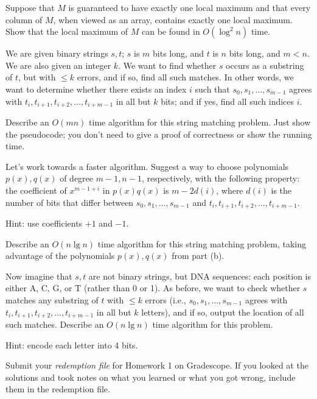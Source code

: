 \begin{qunlist}
Suppose that $M$ is guaranteed to have exactly one local maximum and that every column of $M$, when viewed as an array, contains exactly one local maximum. Show that the local maximum of $M$ can be found in $O(\log^2 n)$ time. 




\pagebreak
{}

We are given binary strings $s,t$; $s$ is $m$ bits long, and $t$ is $n$ bits long,
and $m<n$.
We are also given an integer $k$.
We want to find whether $s$ occurs as a substring of $t$,
but with $\le k$ errors, and if so, find all such matches.
In other words, we want to determine whether there exists an index $i$
such that $s_0,s_1,\dots,s_{m-1}$ agrees with
$t_i,t_{i+1},t_{i+2},\dots,t_{i+m-1}$ in all but $k$ bits; and if yes,
find all such indices $i$.
\begin{qparts}
\item Describe an $O(mn)$ time algorithm for this string matching problem.
Just show the pseudocode; you don't need to give a proof of correctness
or show the running time.

\item Let's work towards a faster algorithm.
Suggest a way to choose polynomials $p(x),q(x)$ of degree $m-1,n-1$,
respectively, with the following property:
the coefficient of $x^{m-1+i}$ in $p(x)q(x)$ is $m-2d(i)$,
where $d(i)$ is the number of bits that differ between
$s_0,s_1,\dots,s_{m-1}$ and $t_i,t_{i+1},t_{i+2},\dots,t_{i+m-1}$.

Hint: use coefficients $+1$ and $-1$.

\item Describe an $O(n \lg n)$ time algorithm for this string matching problem,
taking advantage of the polynomials $p(x),q(x)$ from part (b).

\item Now imagine that $s,t$ are not binary strings, but DNA sequences:
each position is either A, C, G, or T (rather than 0 or 1).
As before, we want to check whether $s$ matches any substring of $t$
with $\le k$ errors
(i.e., $s_0,s_1,\dots,s_{m-1}$ agrees with
$t_i,t_{i+1},t_{i+2},\dots,t_{i+m-1}$ in all but $k$ letters),
and if so, output the location of all such matches.
Describe an $O(n \lg n)$ time algorithm for this problem.

Hint: encode each letter into 4 bits.


\end{qparts}


\pagebreak
{}

Submit your \emph{redemption file} for Homework 1 on Gradescope. If you looked at the solutions and took notes on what you learned or what you got wrong, include them in the redemption file. 


\end{qunlist}
